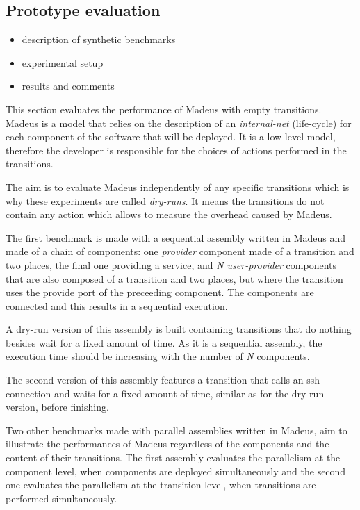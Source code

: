 
\subsection{Prototype evaluation}

\begin{itemize}
\item description of synthetic benchmarks
\item experimental setup
\item results and comments
\end{itemize}
This section evaluates the performance of Madeus with empty transitions.
Madeus is a model that relies on the description of an \emph{internal-net} (life-cycle) for each component of the software that will be deployed. It is a low-level model, therefore the developer is responsible for the choices of actions performed in the transitions.

The aim is to evaluate Madeus independently of any specific transitions which is why these experiments are called \emph{dry-runs}. It means the transitions do not contain any action which allows to measure the overhead caused by Madeus.


The first benchmark is made with a sequential assembly written in Madeus%
and made of a chain of components: one \emph{provider} component made of a transition and two places, the final one providing a service, and \emph{N user-provider} components that are also composed of a transition and two places, but where the transition uses the provide port of the preceeding component. The components are connected and this results in a sequential execution.

A dry-run version of this assembly is built containing transitions that do nothing besides wait for a fixed amount of time. As it is a sequential assembly, the execution time should be increasing with the number of \emph{N} components.

The second version of this assembly features a transition that calls an ssh connection and waits for a fixed amount of time, similar as for the dry-run version, before finishing. 

Two other benchmarks made with parallel assemblies written in Madeus,%
aim to illustrate the performances of Madeus regardless of the components and the content of their transitions.
The first assembly evaluates the parallelism at the component level, when components are deployed simultaneously and the second one evaluates the parallelism at the transition level, when transitions are performed simultaneously.

